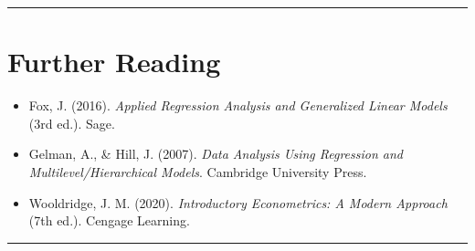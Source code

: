 \documentclass[
  letterpaper,
  DIV=11,
  numbers=noendperiod]{scrreprt}
\providecommand{\tightlist}{%
  \setlength{\itemsep}{0pt}\setlength{\parskip}{0pt}}
\begin{document}
\begin{center}\rule{0.5\linewidth}{0.5pt}\end{center}

\section{Further Reading}\label{further-reading}

\begin{itemize}
\tightlist
\item
  Fox, J. (2016). \emph{Applied Regression Analysis and Generalized
  Linear Models} (3rd ed.). Sage.
\item
  Gelman, A., \& Hill, J. (2007). \emph{Data Analysis Using Regression
  and Multilevel/Hierarchical Models}. Cambridge University Press.
\item
  Wooldridge, J. M. (2020). \emph{Introductory Econometrics: A Modern
  Approach} (7th ed.). Cengage Learning.
\end{itemize}

\begin{center}\rule{0.5\linewidth}{0.5pt}\end{center}
\end{document}

